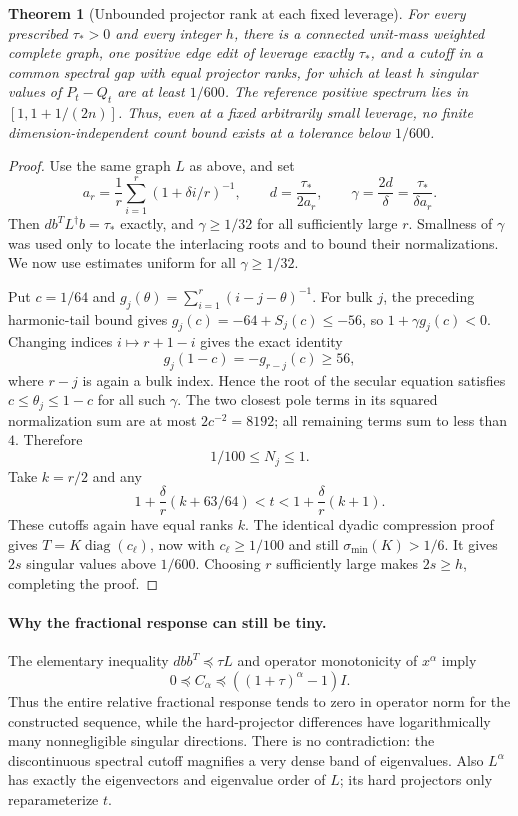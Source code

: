 \documentclass[11pt]{article}
\newtheorem{theorem}{Theorem}
\begin{document}
\begin{theorem}[Unbounded projector rank at each fixed leverage]
\label{thm:fixedtau}
For every prescribed $\tau_*>0$ and every integer $h$, there is a
connected unit-mass weighted complete graph, one positive edge edit
of leverage \emph{exactly} $\tau_*$, and a cutoff in a common spectral
gap with equal projector ranks, for which at least $h$ singular values
of $P_t-Q_t$ are at least $1/600$.
The reference positive spectrum lies in $[1,1+1/(2n)]$.
Thus, even at a fixed arbitrarily small leverage, no finite
dimension-independent count bound exists at a tolerance below $1/600$.
\end{theorem}

\begin{proof}
Use the same graph $L$ as above, and set
\[
 a_r=\frac1r\sum_{i=1}^r(1+\delta i/r)^{-1},\qquad
 d=\frac{\tau_*}{2a_r},\qquad
 \gamma=\frac{2d}{\delta}=\frac{\tau_*}{\delta a_r}.
\]
Then $db^TL^\dagger b=\tau_*$ exactly, and $\gamma\ge1/32$ for
all sufficiently large $r$. Smallness of $\gamma$ was used only
to locate the interlacing roots and to bound their normalizations.
We now use estimates uniform for all $\gamma\ge1/32$.

Put $c=1/64$ and
$g_j(\theta)=\sum_{i=1}^r(i-j-\theta)^{-1}$.
For bulk $j$, the preceding harmonic-tail bound gives
$g_j(c)=-64+S_j(c)\le-56$, so
$1+\gamma g_j(c)<0$.
Changing indices $i\mapsto r+1-i$ gives the exact identity
\[
 g_j(1-c)=-g_{r-j}(c)\ge56,
\]
where $r-j$ is again a bulk index. Hence the root of the secular
equation satisfies $c\le\theta_j\le1-c$ for all such $\gamma$.
The two closest pole terms in its squared normalization sum are
at most $2c^{-2}=8192$; all remaining terms sum to less than $4$.
Therefore
\[
 1/100\le N_j\le1.
\]
Take $k=r/2$ and any
\[
 1+\frac\delta r(k+63/64)<t<1+\frac\delta r(k+1).
\]
These cutoffs again have equal ranks $k$. The identical dyadic
compression proof gives $T=K\operatorname{diag}(c_\ell)$, now
with $c_\ell\ge1/100$ and still $\sigma_{\min}(K)>1/6$.
It gives $2s$ singular values above $1/600$. Choosing $r$ sufficiently
large makes $2s\ge h$, completing the proof.
\end{proof}

\paragraph{Why the fractional response can still be tiny.}
The elementary inequality $dbb^T\preceq\tau L$ and operator
monotonicity of $x^\alpha$ imply
\[
 0\preceq C_\alpha\preceq((1+\tau)^\alpha-1)I.
\]
Thus the entire relative fractional response tends to zero in operator
norm for the constructed sequence, while the hard-projector differences
have logarithmically many nonnegligible singular directions. There is
no contradiction: the discontinuous spectral cutoff magnifies a very
dense band of eigenvalues. Also $L^\alpha$ has exactly the eigenvectors
and eigenvalue order of $L$; its hard projectors only reparameterize $t$.
\end{document}
